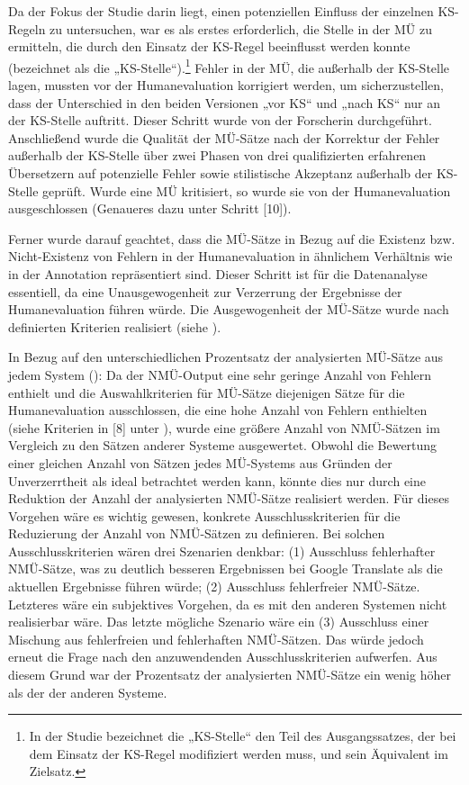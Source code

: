 Da der Fokus der Studie darin liegt, einen potenziellen Einfluss der einzelnen KS-Regeln zu untersuchen, war es als erstes erforderlich, die Stelle in der MÜ zu ermitteln, die durch den Einsatz der KS-Regel beeinflusst werden konnte (bezeichnet als die „KS-Stelle“).\footnote{{{{In der Studie bezeichnet die „KS-Stelle“ den Teil des Ausgangssatzes, der bei dem Einsatz der KS-Regel modifiziert werden muss, und sein Äquivalent im Zielsatz.}}} } Fehler in der MÜ, die außerhalb der KS-Stelle lagen, mussten vor der Humanevaluation korrigiert werden, um sicherzustellen, dass der Unterschied in den beiden Versionen „vor KS“ und „nach KS“ nur an der KS-Stelle auftritt. Dieser Schritt wurde von der Forscherin durchgeführt. Anschließend wurde die Qualität der MÜ-Sätze nach der Korrektur der Fehler außerhalb der KS-Stelle über zwei Phasen von drei qualifizierten erfahrenen Übersetzern auf potenzielle Fehler sowie stilistische Akzeptanz außerhalb der KS-Stelle geprüft. Wurde eine MÜ kritisiert, so wurde sie von der Humanevaluation ausgeschlossen (Genaueres dazu unter  Schritt [10]).

Ferner wurde darauf geachtet, dass die MÜ-Sätze in Bezug auf die Existenz bzw. Nicht-Existenz von Fehlern in der Humanevaluation in ähnlichem Verhältnis wie in der Annotation repräsentiert sind. Dieser Schritt ist für die Datenanalyse essentiell, da eine Unausgewogenheit zur Verzerrung der Ergebnisse der Humanevaluation führen würde. Die Ausgewogenheit der MÜ-Sätze wurde nach definierten Kriterien realisiert (siehe ).

\largerpage
In Bezug auf den unterschiedlichen Prozentsatz der analysierten MÜ-Sätze aus jedem System (): Da der NMÜ-Output eine sehr geringe Anzahl von Fehlern enthielt und die Auswahlkriterien für MÜ-Sätze diejenigen Sätze für die Humanevaluation ausschlossen, die eine hohe Anzahl von Fehlern enthielten (siehe Kriterien in [8] unter ), wurde eine größere Anzahl von NMÜ-Sätzen im Vergleich zu den Sätzen anderer Systeme ausgewertet. Obwohl die Bewertung einer gleichen Anzahl von Sätzen jedes MÜ-Systems aus Gründen der Unverzerrtheit als ideal betrachtet werden kann, könnte dies nur durch eine Reduktion der Anzahl der analysierten NMÜ-Sätze realisiert werden. Für dieses Vorgehen wäre es wichtig gewesen, konkrete Ausschlusskriterien für die Reduzierung der Anzahl von NMÜ-Sätzen zu definieren. Bei solchen Ausschlusskriterien wären drei Szenarien denkbar: (1) Ausschluss fehlerhafter NMÜ-Sätze, was zu deutlich besseren Ergebnissen bei Google Translate als die aktuellen Ergebnisse führen würde; (2) Ausschluss fehlerfreier NMÜ-Sätze. Letzteres wäre ein subjektives Vorgehen, da es mit den anderen Systemen nicht realisierbar wäre. Das letzte mögliche Szenario wäre ein (3) Ausschluss einer Mischung aus fehlerfreien und fehlerhaften NMÜ-Sätzen. Das würde jedoch erneut die Frage nach den anzuwendenden Ausschlusskriterien aufwerfen. Aus diesem Grund war der Prozentsatz der analysierten NMÜ-Sätze ein wenig höher als der der anderen Systeme.

